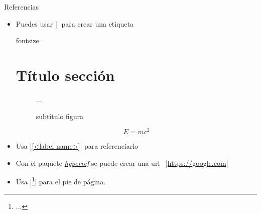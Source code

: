 \begin{frame}[fragile]{Referencias}
  \begin{itemize}
    \item Puedes usar \latexinline|\label{<label name>}| para crear una etiqueta
          \begin{latexcode*}{fontsize=\scriptsize}
            \section{Título sección}\label{sec:label-a}
            \begin{figure}
              ...
              \caption{subtítulo figura}\label{fig:label-b}
            \end{figure}
            \begin{equation}
              E=mc^2 \label{ecn:lable-c}
            \end{equation}
          \end{latexcode*}
    \item Usa \latexinline|\ref{<label name>}| para referenciarlo
    \item Con el paquete \href{http://texdoc.net/texmf-dist/doc/latex/hyperref/manual.pdf}{\emph{hyperref}} se puede crear una url ~\latexinline|\url{https://google.com}|
    \item Usa \latexinline|\footnote{...}| para el pie de página.
  \end{itemize}
\end{frame}



